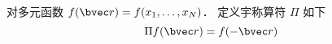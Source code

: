 

对多元函数 $f(\bvec r) = f(x_1, \dots, x_N)$．  定义宇称算符 $\Pi$ 如下
\begin{equation}
\Pi f(\bvec r) = f(-\bvec r)
\end{equation}
